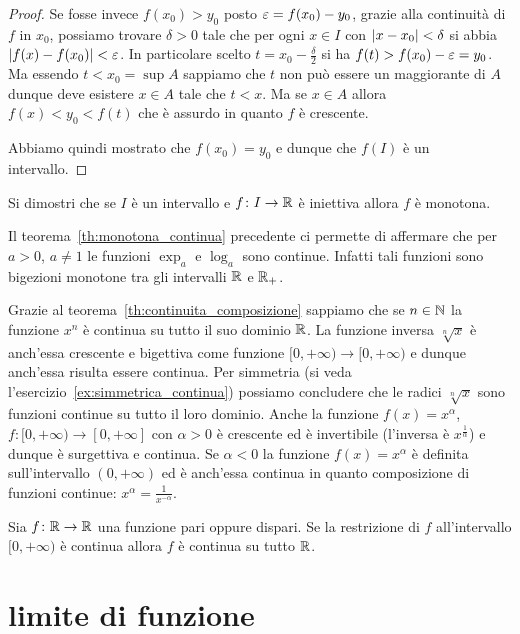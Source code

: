 \begin{proof}
Se fosse invece $f(x_0)>y_0$ posto $\varepsilon = f(x_0)-y_0$,
grazie alla continuità di $f$ in $x_0$,
possiamo trovare $\delta>0$ tale che per ogni $x\in I$
con ${\left|x-x_0\right|}<\delta$ si abbia ${\left|f(x)-f(x_0)\right|}<\varepsilon$.
In particolare scelto $t = x_0 - \frac \delta 2$
si ha $f(t) > f(x_0)-\varepsilon = y_0$. 
Ma essendo $t<x_0 = \sup A$ sappiamo che $t$ non può essere 
un maggiorante di $A$ dunque deve esistere $x\in A$
tale che $t<x$. 
Ma se $x\in A$ allora $f(x) < y_0 < f(t)$
che è assurdo in quanto $f$ è crescente.

Abbiamo quindi mostrato che $f(x_0)=y_0$ e dunque
che $f(I)$ è un intervallo.
\end{proof}
%
\begin{exercise}
Si dimostri che se $I$ è un intervallo e $f\colon I\to \mathbb R$
è iniettiva allora $f$ è monotona. 
\end{exercise}

Il teorema~\ref{th:monotona_continua} precedente ci permette di affermare che per $a>0$, $a\neq 1$ 
le funzioni 
$\exp_a$ e $\log_a$ sono continue. 
Infatti tali funzioni sono bigezioni monotone tra 
gli intervalli $\mathbb R$ e $\mathbb R_+$.

Grazie al teorema~\ref{th:continuita_composizione} sappiamo 
che se $n\in \mathbb N$ la funzione $x^n$ è continua su tutto il suo 
dominio $\mathbb R$. 
La funzione inversa $\sqrt[n]{x}$ è anch'essa crescente e 
bigettiva come funzione $[0,+\infty)\to[0,+\infty)$ e dunque 
anch'essa risulta essere continua.
Per simmetria (si veda l'esercizio~\ref{ex:simmetrica_continua}) 
possiamo concludere 
che le radici $\sqrt[n]{x}$ sono 
funzioni continue su tutto il loro dominio.
Anche la funzione $f(x) = x^\alpha$, $f\colon [0,+\infty)\to [0,+\infty]$ 
con $\alpha>0$ è crescente ed è invertibile (l'inversa è $x^{\frac 1 \alpha}$)
e dunque è surgettiva e continua.
Se $\alpha<0$ la funzione $f(x)=x^\alpha$ è definita sull'intervallo 
$(0,+\infty)$ ed è anch'essa continua in quanto 
composizione di funzioni continue: $x^{\alpha} = \frac{1}{x^{-\alpha}}$.

%
\begin{exercise}\label{ex:simmetrica_continua}
  Sia $f\colon \mathbb R\to \mathbb R$ una funzione pari oppure dispari.
  Se la restrizione di $f$ all'intervallo $[0,+\infty)$ 
  è continua allora $f$ è continua su tutto $\mathbb R$.
\end{exercise}


\section{limite di funzione}

